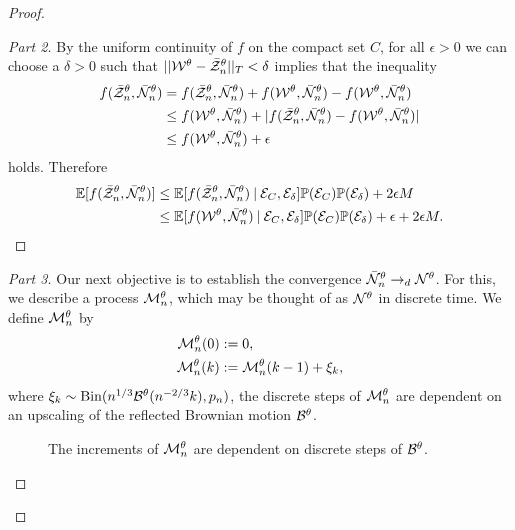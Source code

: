 \begin{proof}
\begin{proof}[Part 2]
By the uniform continuity of $f$ on the compact set $C$, for all $\epsilon>0$ we can choose a $\delta > 0$ such that $\norm{\WtX - \rzntX}_T < \delta$ implies
that the inequality
\begin{equation*}
\begin{aligned}
f(\rzntX, \rnntX) &= f(\rzntX, \rnntX) + f(\WtX, \rnntX) - f(\WtX, \rnntX) \\
&\leq f(\WtX, \rnntX) + |f(\rzntX, \rnntX) - f(\WtX, \rnntX)| \\
&\leq f(\WtX, \rnntX) + \epsilon
\end{aligned}
\end{equation*}
holds. Therefore
\begin{equation} \label{E: Estimation step 3}
\begin{aligned}
\Exp{f(\rzntX, \rnntX) } 
&\leq \Exp{f(\rzntX, \rnntX) \cond \Event{C}, \Event{\delta}}\Prob(\Event{C})\Prob(\Event{\delta}) + 2 \epsilon M \\
&\leq \Exp{f(\WtX, \rnntX) \cond \Event{C}, \Event{\delta}}\Prob(\Event{C})\Prob(\Event{\delta}) + \epsilon + 2 \epsilon M.
\end{aligned}
\end{equation}
\end{proof}




\begin{proof}[Part 3]\renewcommand{\qedsymbol}{}
Our next objective is to establish the convergence $\rnntX \rightarrow_d \NtX$.
For this, we describe a process $\Ndis$, which may be thought of as $\NtX$ in discrete time.
We define $\Ndis$ by
\begin{equation} \label{D: Ndis}
\begin{aligned}
\Ndis(0) &:= 0, \\
\Ndis(k) &:= \Ndis(k-1) + \xi_k, 
\end{aligned}
\end{equation}
where $\xi_k \sim \Binom(\n{1}{3}\BtX(\n{-2}{3}k), \p)$,
the discrete steps of $\Ndis$ are dependent on an upscaling of the reflected Brownian motion $\BtX$.

\begin{figure}[ht]
	\centering
	
	\caption{The increments of $\Ndis$ are dependent on discrete steps of $\BtX$.} 
	\label{F: Mn}
\end{figure}


\end{proof}
\end{proof}
